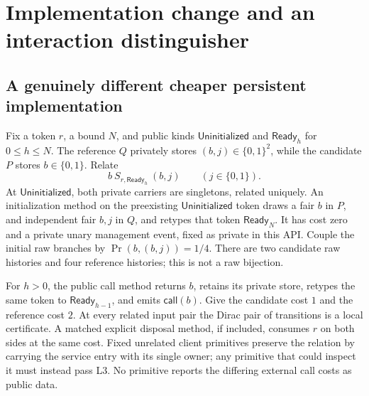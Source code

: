 \documentclass[11pt,a4paper]{article}
\theoremstyle{definition}
\newcommand{\Ready}{\mathsf{Ready}}
\newcommand{\Uninit}{\mathsf{Uninitialized}}
\begin{document}
\section{Implementation change and an interaction distinguisher}
\label{sec:examples}

\subsection{A genuinely different cheaper persistent implementation}
Fix a token $r$, a bound $N$, and public kinds $\Uninit$ and
$\Ready_h$ for $0\le h\le N$. The reference $Q$ privately stores
$(b,j)\in\{0,1\}^2$, while the candidate $P$ stores
$b\in\{0,1\}$. Relate
\[
 b\ S_{r,\Ready_h}\ (b,j)\qquad(j\in\{0,1\}).
\]
At $\Uninit$, both private carriers are singletons, related uniquely.
An initialization method on the preexisting $\Uninit$ token draws a
fair $b$ in $P$, and independent fair $b,j$ in $Q$, and retypes that token
$\Ready_N$. It has cost zero and a private unary management event, fixed
as private in this API. Couple the initial raw branches by
$\Pr(b,(b,j))=1/4$. There are two candidate raw histories and four
reference histories; this is not a raw bijection.

For $h>0$, the public call method returns $b$, retains its private store,
retypes the same token to $\Ready_{h-1}$, and emits
$\mathsf{call}(b)$. Give the candidate cost $1$ and the reference cost
$2$. At every related input pair the Dirac pair of transitions is a
local certificate. A matched explicit disposal method, if included,
consumes $r$ on both sides at the same cost. Fixed unrelated client
primitives preserve the relation by carrying the service entry with its
single owner; any primitive that could inspect it must instead pass L3.
No primitive reports the differing external call costs as public data.
\end{document}

